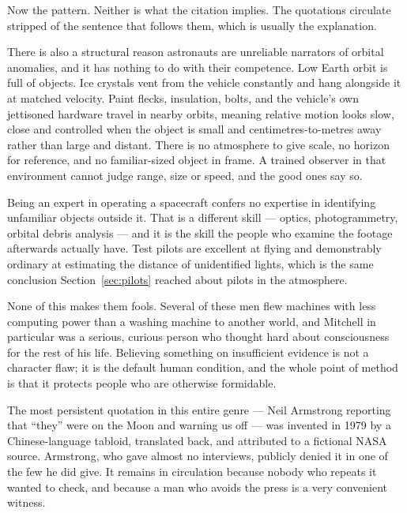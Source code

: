 Now the pattern.  Neither is what the citation implies. The quotations circulate stripped of the sentence
that follows them, which is usually the explanation.

There is also a structural reason astronauts are unreliable narrators of orbital anomalies, and it
has nothing to do with their competence. Low Earth orbit is full of objects. Ice crystals vent from
the vehicle constantly and hang alongside it at matched velocity. Paint flecks, insulation, bolts,
and the vehicle's own jettisoned hardware travel in nearby orbits, meaning relative motion looks
slow, close and controlled when the object is small and centimetres-to-metres away rather than
large and distant. There is no atmosphere to give scale, no horizon for reference, and no
familiar-sized object in frame. A trained observer in that environment cannot judge range, size or
speed, and the good ones say so.

 Being an expert in
operating a spacecraft confers no expertise in identifying unfamiliar objects outside it. That is a
different skill --- optics, photogrammetry, orbital debris analysis --- and it is the skill the
people who examine the footage afterwards actually have. Test pilots are excellent at flying and
demonstrably ordinary at estimating the distance of unidentified lights, which is the same
conclusion Section~\ref{sec:pilots} reached about pilots in the atmosphere.

None of this makes them fools. Several of these men flew machines with less computing power than a
washing machine to another world, and Mitchell in particular was a serious, curious person who
thought hard about consciousness for the rest of his life. Believing something on insufficient
evidence is not a character flaw; it is the default human condition, and the whole point of method
is that it protects people who are otherwise formidable.

\begin{funfact}
The most persistent quotation in this entire genre --- Neil Armstrong reporting that ``they''
were on the Moon and warning us off --- was invented in 1979 by a Chinese-language tabloid,
translated back, and attributed to a fictional NASA source. Armstrong, who gave almost no
interviews, publicly denied it in one of the few he did give. It remains in circulation because
nobody who repeats it wanted to check, and because a man who avoids the press is a very convenient
witness.
\end{funfact}

